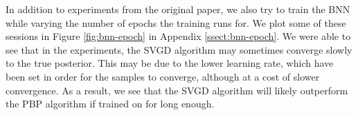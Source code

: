 In addition to experiments from the original paper, we also try to train the BNN while varying the number of epochs the training runs for. We plot some of these sessions in Figure \ref{fig:bnn-epoch} in Appendix \ref{ssect:bnn-epoch}. We were able to see that in the experiments, the SVGD algorithm may sometimes converge slowly to the true posterior. This may be due to the lower learning rate, which have been set in order for the samples to converge, although at a cost of slower convergence. As a result, we see that the SVGD algorithm will likely outperform the PBP algorithm if trained on for long enough.